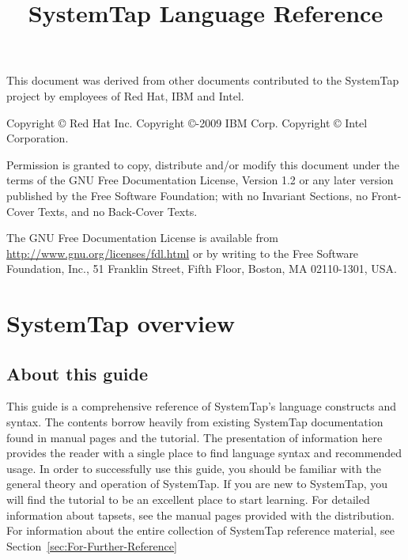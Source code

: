 \documentclass[twoside,english]{article}
\begin{document}
\title{SystemTap Language Reference}

\maketitle
\newpage{}
This document was derived from other documents contributed to the SystemTap project by employees of Red Hat, IBM and Intel.\newline

Copyright \copyright{} Red Hat Inc.\newline
Copyright \copyright{}-2009 IBM Corp.\newline
Copyright \copyright{} Intel Corporation.\newline

Permission is granted to copy, distribute and/or modify this document
under the terms of the GNU Free Documentation License, Version 1.2
or any later version published by the Free Software Foundation;
with no Invariant Sections, no Front-Cover Texts, and no Back-Cover Texts.\newline

The GNU Free Documentation License is available from 
\url{http://www.gnu.org/licenses/fdl.html} or by writing to
the Free Software Foundation, Inc., 51 Franklin Street,
Fifth Floor, Boston, MA 02110-1301, USA.
\newpage{}
\tableofcontents{}
\listoftables
\newpage{}

\section{SystemTap overview\label{sec:SystemTap-Overview}}

\subsection{About this guide}

This guide is a comprehensive reference of SystemTap's language constructs
and syntax. The contents borrow heavily from existing SystemTap documentation
found in manual pages and the tutorial. The presentation of information here
provides the reader with a single place to find language syntax and recommended
usage. In order to successfully use this guide, you should be familiar with
the general theory and operation of SystemTap. If you are new to SystemTap,
you will find the tutorial to be an excellent place to start learning. For
detailed information about tapsets, see the manual pages provided with the
distribution. For information about the entire collection of SystemTap reference
material, see Section~\ref{sec:For-Further-Reference} 
\end{document}

